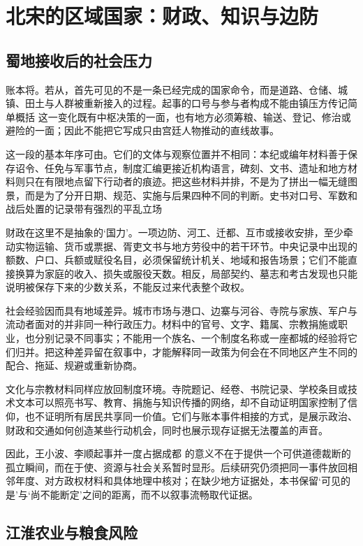 \section{北宋的区域国家：财政、知识与边防}

\subsection{蜀地接收后的社会压力}

账本将。若从，首先可见的不是一条已经完成的国家命令，而是道路、仓储、城镇、田土与人群被重新接入的过程。起事的口号与参与者构成不能由镇压方传记简单概括 这一变化既有中枢决策的一面，也有地方必须筹粮、输送、登记、修治或避险的一面；因此不能把它写成只由宫廷人物推动的直线故事。

这一段的基本年序可由。它们的文体与观察位置并不相同：本纪或编年材料善于保存诏令、任免与军事节点，制度汇编更接近机构语言，碑刻、文书、遗址和地方材料则只在有限地点留下行动者的痕迹。把这些材料并排，不是为了拼出一幅无缝图景，而是为了分开日期、规范、实施与后果四种不同的判断。史书对口号、军数和战后处置的记录带有强烈的平乱立场

财政在这里不是抽象的‘国力’。一项边防、河工、迁都、互市或接收安排，至少牵动实物运输、货币或票据、胥吏文书与地方劳役中的若干环节。中央记录中出现的额数、户口、兵额或赋役名目，必须保留统计机关、地域和报告场景；它们不能直接换算为家庭的收入、损失或服役天数。相反，局部契约、墓志和考古发现也只能说明被保存下来的少数关系，不能反过来代表整个政权。

社会经验因而具有地域差异。城市市场与港口、边寨与河谷、寺院与家族、军户与流动者面对的并非同一种行政压力。材料中的官号、文字、籍属、宗教捐施或职业，也分别记录不同事实；不能用一个族名、一个制度名称或一座都城的经验将它们归并。把这种差异留在叙事中，才能解释同一政策为何会在不同地区产生不同的配合、拖延、规避或重新协商。

文化与宗教材料同样应放回制度环境。寺院题记、经卷、书院记录、学校条目或技术文本可以照亮书写、教育、捐施与知识传播的网络，却不自动证明国家控制了信仰，也不证明所有居民共享同一价值。它们与账本事件相接的方式，是展示政治、财政和交通如何创造某些行动机会，同时也展示现存证据无法覆盖的声音。

因此，王小波、李顺起事并一度占据成都 的意义不在于提供一个可供道德裁断的孤立瞬间，而在于使、资源与社会关系暂时显形。后续研究仍须把同一事件放回相邻年度、对方政权材料和具体地理中核对；在缺少地方证据处，本书保留‘可见的是’与‘尚不能断定’之间的距离，而不以叙事流畅取代证据。

\subsection{江淮农业与粮食风险}

